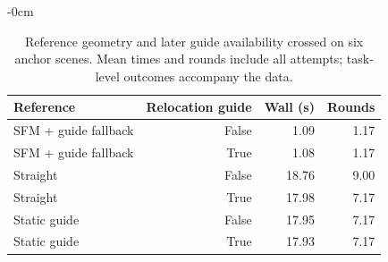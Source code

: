 \begin{table}[htbp]
\begin{adjustwidth}{-\extralength}{0cm}
\caption{Reference geometry and later guide availability crossed on six anchor scenes. Mean times and rounds include all attempts; task-level outcomes accompany the data.\label{tab:initialization-new}}
\centering\small
\begin{tabular}{lrrr}\toprule
Reference & Relocation guide & Wall (s) & Rounds\\\midrule
SFM + guide fallback & False & 1.09 & 1.17\\
SFM + guide fallback & True & 1.08 & 1.17\\
Straight & False & 18.76 & 9.00\\
Straight & True & 17.98 & 7.17\\
Static guide & False & 17.95 & 7.17\\
Static guide & True & 17.93 & 7.17\\
\bottomrule\end{tabular}
\end{adjustwidth}
\end{table}
